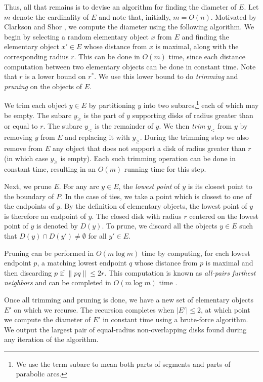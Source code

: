 \documentclass[twoside]{report}
\begin{document}
\begin{paper}
Thus, all that remains is to devise an algorithm for finding the diameter of
$E$. Let $m$ denote the cardinality of $E$ and note that, initially, $m=O(n)$.
Motivated by Clarkson and Shor \cite{cs88}, we compute the diameter using the
following algorithm. We begin by selecting a random elementary object $x$ from
$E$ and finding the elementary object $x'\in E$ whose distance from $x$ is
maximal, along with the corresponding radius $r$.  This can be done in $O(m)$
time, since each distance computation between two elementary objects can be
done in constant time.  Note that $r$ is a lower bound on $r^*$.  We use this
lower bound to do \emph{trimming} and \emph{pruning} on the objects of $E$.

We trim each object $y\in E$ by partitioning $y$ into two
subarcs,\footnote{We use the term subarc to mean both parts of
segments and parts of parabolic arcs.} each of which may be empty.
The subarc $y_\ge$ is the part of $y$ supporting disks of radius
greater than or equal to $r$.  The subarc $y_<$ is the remainder of
$y$.  We then \emph{trim} $y_<$ from $y$ by removing $y$ from $E$ and
replacing it with $y_\ge$.  During the trimming step we also remove
from $E$ any object that does not support a disk of radius greater
than $r$ (in which case $y_\ge$ is empty).  Each such trimming
operation can be done in constant time, resulting in an $O(m)$ running
time for this step.

Next, we prune $E$.  For any arc $y \in E$, the \emph{lowest point} of $y$ is
its closest point to the boundary of $P$. In the case of ties, we take a point
which is closest to one of the endpoints of $y$.  By the definition of
elementary objects, the lowest point of $y$ is therefore an endpoint of $y$.
The closed disk with radius $r$ centered on the lowest point of $y$ is denoted
by $D(y)$.  To prune, we discard all the objects $y \in E$ such that $D(y)
\cap D(y') \neq \emptyset$ for all $y' \in E$.

Pruning can be performed in $O(m\log m)$ time by computing, for each
lowest endpoint $p$, a matching lowest endpoint $q$ whose distance
from $p$ is maximal and then discarding $p$ if $\|pq\|\le 2r$. This
computation is known as \emph{all-pairs furthest neighbors} and can
be completed in $O(m\log m)$ time \cite{ams91}.

Once all trimming and pruning is done, we have a new set of elementary
objects $E'$ on which we recurse.  The recursion completes when $|E'|
\leq 2$, at which point we compute the diameter of $E'$ in constant
time using a brute-force algorithm. We output the largest pair of
equal-radius non-overlapping disks found during any iteration of the
algorithm.


\end{paper}
\end{document}

